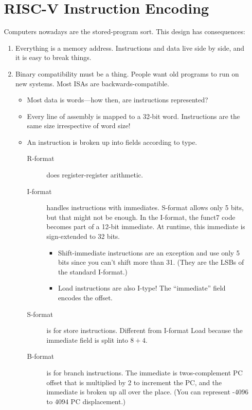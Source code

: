 \chapter{RISC-V Instruction Encoding}
Computers nowadays are the stored-program sort.
This design has consequences:
\begin{enumerate}
  \item Everything is a memory address.
    Instructions and data live side by side, and it is easy to break things.
  \item Binary compatibility must be a thing.
    People want old programs to run on new systems. Most ISAs are backwards-compatible.
    \begin{itemize}
      \item Most data is words---how then, are instructions represented?
      \item Every line of assembly is mapped to a 32-bit word.
        Instructions are the same size irrespective of word size!
      \item An instruction is broken up into fields according to type.
        \begin{description}
          \item[R-format] does register-register arithmetic.
          \item[I-format] handles instructions with immediates. S-format allows only 5 bits, but that might not be enough. In the I-format, the funct7 code becomes part of a 12-bit immediate. At runtime, this immediate is sign-extended to 32 bits.
	          \begin{itemize}
	          	\item Shift-immediate instructions are an exception and use only 5 bits since you can't shift more than 31. (They are the LSBs of the standard I-format.)
	          	\item Load instructions are also I-type! The ``immediate'' field encodes the offset.
	          \end{itemize}
          \item[S-format] is for store instructions. Different from I-format Load because the immediate field is split into \(8+4\).
          \item[B-format] is for branch instructions. The immediate is twos-complement PC offset that is multiplied by 2 to increment the PC, and the immediate is broken up all over the place. (You can represent -4096 to 4094 PC displacement.)


\end{description}
\end{itemize}
\end{enumerate}

